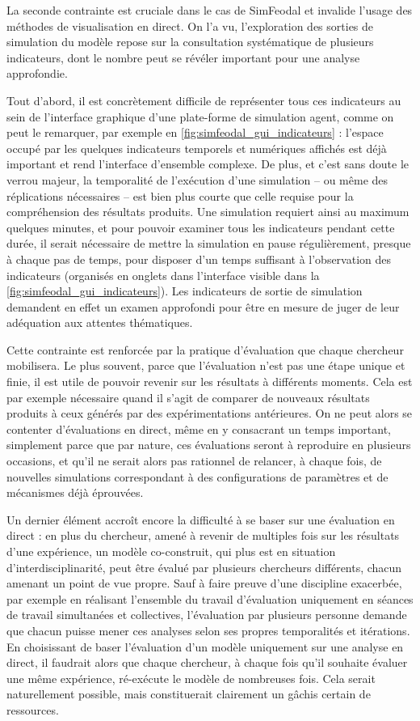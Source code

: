	La seconde contrainte est cruciale dans le cas de SimFeodal et invalide l'usage des méthodes de visualisation en direct.
	On l'a vu, l'exploration des sorties de simulation du modèle repose sur la consultation systématique de plusieurs indicateurs, dont le nombre peut se révéler important pour une analyse approfondie.
	
	Tout d'abord, il est concrètement difficile de représenter tous ces indicateurs au sein de l'interface graphique d'une plate-forme de simulation agent, comme on peut le remarquer, par exemple en \cref{fig:simfeodal_gui_indicateurs} : l'espace occupé par les quelques indicateurs temporels et numériques affichés est déjà important et rend l'interface d'ensemble complexe.
	De plus, et c'est sans doute le verrou majeur, la temporalité de l'exécution d'une simulation -- ou même des réplications nécessaires -- est bien plus courte que celle requise pour la compréhension des résultats produits.
	Une simulation requiert ainsi au maximum quelques minutes, et pour pouvoir examiner tous les indicateurs pendant cette durée, il serait nécessaire de mettre la simulation en pause régulièrement, presque à chaque pas de temps, pour disposer d'un temps suffisant à l'observation des indicateurs (organisés en onglets dans l'interface visible dans la \cref{fig:simfeodal_gui_indicateurs}).
	Les indicateurs de sortie de simulation demandent en effet un examen approfondi pour être en mesure de juger de leur adéquation aux attentes thématiques.
	
	Cette contrainte est renforcée par la pratique d'évaluation que chaque chercheur mobilisera.
	Le plus souvent, parce que l'évaluation n'est pas une étape unique et finie, il est utile de pouvoir revenir sur les résultats à différents moments.
	Cela est par exemple nécessaire quand il s'agit de comparer de nouveaux résultats produits à ceux générés par des expérimentations antérieures.
	On ne peut alors se contenter d'évaluations en direct, même en y consacrant un temps important, simplement parce que par nature, ces évaluations seront à reproduire en plusieurs occasions, et qu'il ne serait alors pas rationnel de relancer, à chaque fois, de nouvelles simulations correspondant à des configurations de paramètres et de mécanismes déjà éprouvées.
	
	Un dernier élément accroît encore la difficulté à se baser sur une évaluation en direct : en plus du chercheur, amené à revenir de multiples fois sur les résultats d'une expérience, un modèle co-construit, qui plus est en situation d'interdisciplinarité, peut être évalué par plusieurs chercheurs différents, chacun amenant un point de vue propre.
	Sauf à faire preuve d'une discipline exacerbée, par exemple en réalisant l'ensemble du travail d'évaluation uniquement en séances de travail simultanées et collectives, l'évaluation par plusieurs personne demande que chacun puisse mener ces analyses selon ses propres temporalités et itérations.
	En choisissant de baser l'évaluation d'un modèle uniquement sur une analyse en direct, il faudrait alors que chaque chercheur, à chaque fois qu'il souhaite évaluer une même expérience, ré-exécute le modèle de nombreuses fois.
	Cela serait naturellement possible, mais constituerait clairement un gâchis certain de ressources.
	
